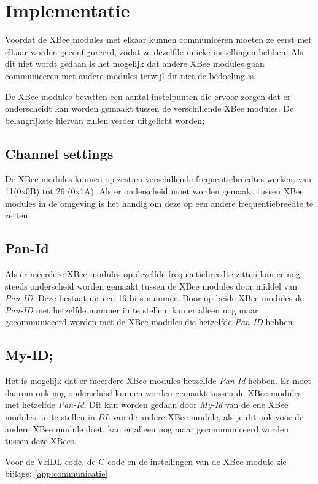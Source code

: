 \documentclass{report}
\begin{document}
\section{Implementatie}
Voordat de XBee modules met elkaar kunnen communiceren moeten ze eerst met elkaar worden geconfigureerd, zodat ze dezelfde unieke instellingen hebben.
Als dit niet wordt gedaan is het mogelijk dat andere XBee modules gaan communiceren met andere modules terwijl dit niet de bedoeling is.

De XBee modules bevatten een aantal instelpunten die ervoor zorgen dat er onderscheidt kan worden gemaakt tussen de verschillende XBee modules.
De belangrijkste hiervan zullen verder uitgelicht worden;

\subsection{Channel settings}
De XBee modules kunnen op zestien verschillende frequentiebreedtes werken, van 11(0x0B) tot 26 (0x1A).
Als er onderscheid moet worden gemaakt tussen XBee modules in de omgeving is het handig om deze op een andere frequentiebreedte te zetten.\\

\subsection{Pan-Id}
Als er meerdere XBee modules op dezelfde frequentiebreedte zitten kan er nog steeds onderscheid worden gemaakt tussen de XBee modules door middel van \textit{Pan-ID}.
Deze bestaat uit een 16-bits nummer.
Door op beide XBee modules de \textit{Pan-ID}  met hetzelfde nummer in te stellen, kan er alleen nog maar gecommuniceerd worden met de XBee modules die hetzelfde \textit{Pan-ID} hebben.

\subsection{My-ID;}
Het is mogelijk dat er meerdere XBee modules hetzelfde\textit{ Pan-Id} hebben.
Er moet daarom ook nog onderscheid kunnen worden gemaakt tussen de XBee modules met hetzelfde \textit{Pan-Id}.
Dit kan worden gedaan door \textit{My-Id} van de ene XBee modules, in te stellen in \textit{DL} van de andere XBee module, als je dit ook voor de andere XBee module doet, kan er alleen nog maar gecommuniceerd worden tussen deze XBees.


Voor de VHDL-code, de C-code en de instellingen van de XBee module zie bijlage; \ref{app:communicatie}
\end{document}
